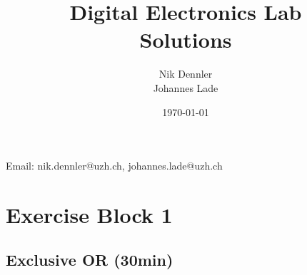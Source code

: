 \documentclass[10pt,a4paper]{article}
\author{Nik Dennler \\ Johannes Lade}
\title{Digital Electronics Lab\\\textbf{Solutions}}
\date{\today{}}
\begin{document}
	
	\begin{titlepage}
		\maketitle
		\begin{center}
			Email: nik.dennler@uzh.ch, johannes.lade@uzh.ch
		\end{center}
		\thispagestyle{empty}
	\end{titlepage}
	
	
	
	
	\section{Exercise Block 1}
	\label{sec:exercise-block-1}
	
	\subsection{Exclusive OR (30min)}\label{subsec:ex-1}
	
\end{document}
